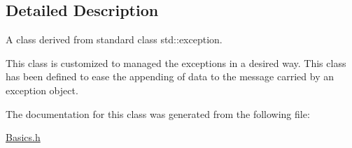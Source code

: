 \subsection{Detailed Description}
A class derived from standard class {\ttfamily std\+::exception}. 

This class is customized to managed the exceptions in a desired way. This class has been defined to ease the appending of data to the message carried by an exception object. 

The documentation for this class was generated from the following file\+:\begin{DoxyCompactItemize}
\item 
\hyperlink{Basics_8h}{Basics.\+h}\end{DoxyCompactItemize}
